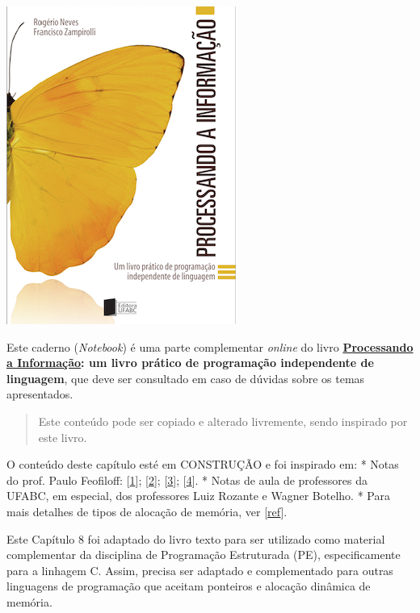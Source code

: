 \documentclass[12pt,a4paper]{article}
\begin{document}
    \includegraphics{"figs/Capa_Processando_Informacao.jpg"}

Este caderno (\emph{Notebook}) é uma parte complementar \emph{online} do
livro
\textbf{\href{https://editora.ufabc.edu.br/matematica-e-ciencias-da-computacao/58-processando-a-informacao}{Processando
a Informação}: um livro prático de programação independente de
linguagem}, que deve ser consultado em caso de dúvidas sobre os temas
apresentados.

\begin{quote}
Este conteúdo pode ser copiado e alterado livremente, sendo inspirado
por este livro.
\end{quote}

    O conteúdo deste capítulo esté em CONSTRUÇÃO e foi inspirado em: * Notas
do prof. Paulo Feofiloff:
{[}\href{https://www.ime.usp.br/~pf/algoritmos/aulas/pont.html}{1}{]};
{[}\href{https://www.ime.usp.br/~pf/algoritmos/aulas/aloca.html}{2}{]};
{[}\href{https://www.ime.usp.br/~pf/algoritmos/aulas/lista.html}{3}{]};
{[}\href{https://www.ime.usp.br/~pf/algoritmos/aulas/fila.html}{4}{]}. *
Notas de aula de professores da UFABC, em especial, dos professores Luiz
Rozante e Wagner Botelho. * Para mais detalhes de tipos de alocação de
memória, ver
{[}\href{https://www.inf.ufpr.br/roberto/ci067/10_aloc.html}{ref}{]}.

Este Capítulo 8 foi adaptado do livro texto para ser utilizado como
material complementar da disciplina de Programação Estruturada (PE),
especificamente para a linhagem C. Assim, precisa ser adaptado e
complementado para outras linguagens de programação que aceitam
ponteiros e alocação dinâmica de memória.
\end{document}
